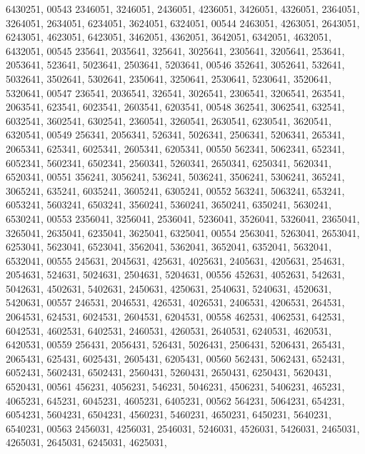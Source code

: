 \begin{DoxyCode}
      6430251,
00543       2346051, 3246051, 2436051, 4236051, 3426051, 4326051, 2364051, 3264051, 2634051, 6234051, 3624051, 
      6324051,
00544       2463051, 4263051, 2643051, 6243051, 4623051, 6423051, 3462051, 4362051, 3642051, 6342051, 4632051, 
      6432051,
00545        235641, 2035641,  325641, 3025641, 2305641, 3205641,  253641, 2053641,  523641, 5023641, 2503641, 
      5203641,
00546        352641, 3052641,  532641, 5032641, 3502641, 5302641, 2350641, 3250641, 2530641, 5230641, 3520641, 
      5320641,
00547        236541, 2036541,  326541, 3026541, 2306541, 3206541,  263541, 2063541,  623541, 6023541, 2603541, 
      6203541,
00548        362541, 3062541,  632541, 6032541, 3602541, 6302541, 2360541, 3260541, 2630541, 6230541, 3620541, 
      6320541,
00549        256341, 2056341,  526341, 5026341, 2506341, 5206341,  265341, 2065341,  625341, 6025341, 2605341, 
      6205341,
00550        562341, 5062341,  652341, 6052341, 5602341, 6502341, 2560341, 5260341, 2650341, 6250341, 5620341, 
      6520341,
00551        356241, 3056241,  536241, 5036241, 3506241, 5306241,  365241, 3065241,  635241, 6035241, 3605241, 
      6305241,
00552        563241, 5063241,  653241, 6053241, 5603241, 6503241, 3560241, 5360241, 3650241, 6350241, 5630241, 
      6530241,
00553       2356041, 3256041, 2536041, 5236041, 3526041, 5326041, 2365041, 3265041, 2635041, 6235041, 3625041, 
      6325041,
00554       2563041, 5263041, 2653041, 6253041, 5623041, 6523041, 3562041, 5362041, 3652041, 6352041, 5632041, 
      6532041,
00555        245631, 2045631,  425631, 4025631, 2405631, 4205631,  254631, 2054631,  524631, 5024631, 2504631, 
      5204631,
00556        452631, 4052631,  542631, 5042631, 4502631, 5402631, 2450631, 4250631, 2540631, 5240631, 4520631, 
      5420631,
00557        246531, 2046531,  426531, 4026531, 2406531, 4206531,  264531, 2064531,  624531, 6024531, 2604531, 
      6204531,
00558        462531, 4062531,  642531, 6042531, 4602531, 6402531, 2460531, 4260531, 2640531, 6240531, 4620531, 
      6420531,
00559        256431, 2056431,  526431, 5026431, 2506431, 5206431,  265431, 2065431,  625431, 6025431, 2605431, 
      6205431,
00560        562431, 5062431,  652431, 6052431, 5602431, 6502431, 2560431, 5260431, 2650431, 6250431, 5620431, 
      6520431,
00561        456231, 4056231,  546231, 5046231, 4506231, 5406231,  465231, 4065231,  645231, 6045231, 4605231, 
      6405231,
00562        564231, 5064231,  654231, 6054231, 5604231, 6504231, 4560231, 5460231, 4650231, 6450231, 5640231, 
      6540231,
00563       2456031, 4256031, 2546031, 5246031, 4526031, 5426031, 2465031, 4265031, 2645031, 6245031, 4625031, 

\end{DoxyCode}
